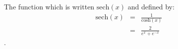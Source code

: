 
The function which is written $\mathrm{sech}(x)$ and defined by:
\begin{eqnarray*}
\mathrm{sech}(x) &=& \frac{1}{\mathrm{cosh}(x)}\\
&=& \frac{2}{e^x + e^{-x}}
\end{eqnarray*}.
  
